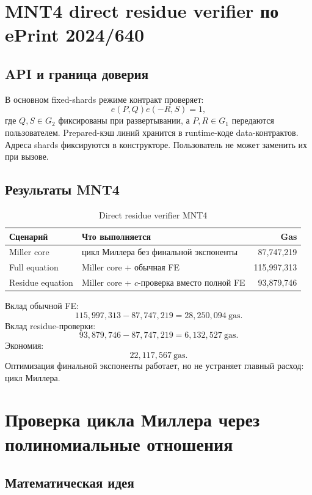 \documentclass[12pt,a4paper]{article}
\newcommand{\Gas}{\mathrm{gas}}
\begin{document}
\section{MNT4 direct residue verifier по ePrint 2024/640}

\subsection{API и граница доверия}

В основном fixed-shards режиме контракт проверяет:
\[
    e(P,Q)e(-R,S)=1,
\]
где $Q,S\in G_2$ фиксированы при развертывании, а $P,R\in G_1$ передаются
пользователем. Prepared-кэш линий хранится в runtime-коде data-контрактов.
Адреса shards фиксируются в конструкторе. Пользователь не может заменить их
при вызове.

\subsection{Результаты MNT4}

\begin{table}[htbp]
\centering
\caption{Direct residue verifier MNT4}
\small
\begin{tabularx}{\linewidth}{Y Y r}
\toprule
Сценарий & Что выполняется & Gas \\
\midrule
Miller core & цикл Миллера без финальной экспоненты & 87,747,219 \\
Full equation & Miller core + обычная FE & 115,997,313 \\
Residue equation & Miller core + $c$-проверка вместо полной FE & 93,879,746 \\
\bottomrule
\end{tabularx}
\end{table}

Вклад обычной FE:
\[
    115{,}997{,}313-87{,}747{,}219
    =28{,}250{,}094\ \Gas.
\]
Вклад residue-проверки:
\[
    93{,}879{,}746-87{,}747{,}219
    =6{,}132{,}527\ \Gas.
\]
Экономия:
\[
    22{,}117{,}567\ \Gas.
\]
Оптимизация финальной экспоненты работает, но не устраняет главный расход:
цикл Миллера.

\section{Проверка цикла Миллера через полиномиальные отношения}

\subsection{Математическая идея}
\end{document}
